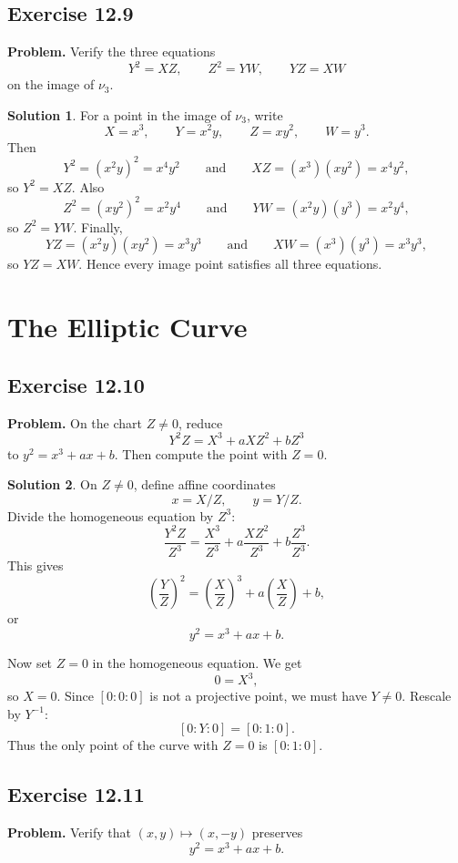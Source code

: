 \documentclass[11pt]{article}
\theoremstyle{definition}
\newtheorem*{solution}{Solution}
\begin{document}
\subsection*{Exercise 12.9}
\textbf{Problem.}  Verify the three equations
\[
  Y^2=XZ,\qquad Z^2=YW,\qquad YZ=XW
\]
on the image of \(\nu_3\).

\begin{solution}
For a point in the image of \(\nu_3\), write
\[
  X=x^3,\qquad
  Y=x^2y,\qquad
  Z=xy^2,\qquad
  W=y^3.
\]
Then
\[
  Y^2=(x^2y)^2=x^4y^2
  \qquad\text{and}\qquad
  XZ=(x^3)(xy^2)=x^4y^2,
\]
so \(Y^2=XZ\).  Also
\[
  Z^2=(xy^2)^2=x^2y^4
  \qquad\text{and}\qquad
  YW=(x^2y)(y^3)=x^2y^4,
\]
so \(Z^2=YW\).  Finally,
\[
  YZ=(x^2y)(xy^2)=x^3y^3
  \qquad\text{and}\qquad
  XW=(x^3)(y^3)=x^3y^3,
\]
so \(YZ=XW\).  Hence every image point satisfies all three equations.
\end{solution}

\section{The Elliptic Curve}

\subsection*{Exercise 12.10}
\textbf{Problem.}  On the chart \(Z\neq 0\), reduce
\[
  Y^2Z=X^3+aXZ^2+bZ^3
\]
to \(y^2=x^3+ax+b\).  Then compute the point with \(Z=0\).

\begin{solution}
On \(Z\neq 0\), define affine coordinates
\[
  x=X/Z,\qquad y=Y/Z.
\]
Divide the homogeneous equation by \(Z^3\):
\[
  \frac{Y^2Z}{Z^3}
  =
  \frac{X^3}{Z^3}
  +a\frac{XZ^2}{Z^3}
  +b\frac{Z^3}{Z^3}.
\]
This gives
\[
  \left(\frac{Y}{Z}\right)^2
  =
  \left(\frac{X}{Z}\right)^3
  +a\left(\frac{X}{Z}\right)+b,
\]
or
\[
  y^2=x^3+ax+b.
\]

Now set \(Z=0\) in the homogeneous equation.  We get
\[
  0=X^3,
\]
so \(X=0\).  Since \([0:0:0]\) is not a projective point, we must have
\(Y\neq 0\).  Rescale by \(Y^{-1}\):
\[
  [0:Y:0]=[0:1:0].
\]
Thus the only point of the curve with \(Z=0\) is \([0:1:0]\).
\end{solution}

\subsection*{Exercise 12.11}
\textbf{Problem.}  Verify that \((x,y)\mapsto (x,-y)\) preserves
\[
  y^2=x^3+ax+b.
\]
\end{document}
